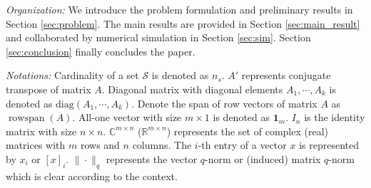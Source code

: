 \documentclass[12pt]{article}  %
\newcommand{\Rb}{{\mathbb{R}}}
\newcommand{\Cb}{{\mathbb{C}}}
\newcommand{\Sc}{{\mathcal{S}}}
\DeclareMathOperator{\rs}{{rowspan}}
\begin{document}



\textit{Organization:} We introduce the problem formulation and preliminary results in Section \ref{sec:problem}. The main results are provided in Section \ref{sec:main_result} and collaborated by numerical simulation in Section \ref{sec:sim}. Section \ref{sec:conclusion} finally concludes the paper.

\textit{Notations:}
Cardinality of a set $\Sc$ is denoted as $n_s$. $A{'}$ represents conjugate transpose of matrix $A$.
Diagonal matrix with diagonal elements $A_1,\cdots,A_k$ is denoted as $\text{diag}(A_1,\cdots,A_k)$.
Denote the span of row vectors of matrix $A$ as $\rs(A)$.
All-one vector with size $m\times 1$ is denoted as $\mathbf{1}_{m}$. $I_n$ is the identity matrix with size $n\times n$. 
$\Cb^{m\times n}$ ($\Rb^{m\times n}$) represents the set of complex (real) matrices with $m$ rows and $n$ columns.
The $i$-th entry of a vector $x$ is represented by $x_i$ or $[x]_i$. $\|\cdot\|_q$ represents the vector $q$-norm or (induced) matrix $q$-norm which is clear according to the context.
\end{document}
